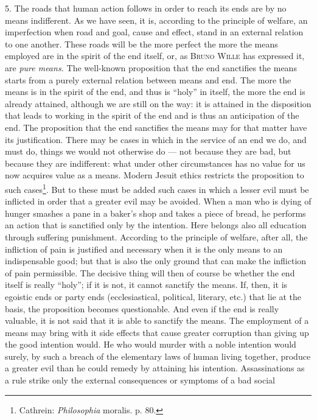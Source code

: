 \documentclass[12pt,a4paper,openany]{book}
\newcommand{\opage}[1]{\marginnote{\footnotesize\textit{[#1]}}}
\begin{document}
5. The roads that human action follows in order to reach its ends are by no means indifferent. As we have
seen, it is, according to the principle of welfare, an imperfection when road and goal, cause and effect,
stand in an external relation to one another. These roads will be the more perfect the more the means
employed are in the spirit of the end itself, or, as \textsc{Bruno Wille} has expressed it, are \textit{pure
means.} The well-known proposition that the end sanctifies the means starts from a purely external relation
between means and end. The more the means is in the
\opage{153}spirit of the end, and thus is ``holy'' in itself, the more the end is already attained, although we are
still on the way: it is attained in the disposition that leads to working in the spirit of the end and is
thus an anticipation of the end. The proposition that the end sanctifies the means may for that matter
have its justification. There may be cases in which in the service of an end we do, and must do, things we
would not otherwise do --- not because they are bad, but because they are indifferent: what under other
circumstances has no value for us now acquires value as a means. Modern Jesuit ethics restricts the
proposition to such cases\footnote[1]{Cathrein: \textit{Philosophia} moralis. p. 80.}. But to these must
be added such cases in which a lesser evil must be inflicted in order that a greater evil may be avoided.
When a man who is dying of hunger smashes a pane in a baker's shop and takes a piece of bread, he performs
an action that is sanctified only by the intention. Here belongs also all education through suffering
punishment. According to the principle of welfare, after all, the infliction of pain is justified and
necessary when it is the only means to an indispensable good; but that is also the only ground that can
make the infliction of pain permissible. The decisive thing will then of course be whether the end itself
is really ``holy''; if it is not, it cannot sanctify the means. If, then, it is egoistic ends or party ends
(ecclesiastical, political, literary, etc.) that lie at the basis, the proposition becomes questionable.
And even if the end is really valuable, it is not said that it is able to sanctify the means. The
employment of a means may bring with it side effects that cause greater corruption than giving up the good
intention would. He who would murder with a noble intention would surely, by such a breach of the
elementary laws of human living together, produce a greater evil than he could remedy by attaining his
intention. Assassinations as a rule strike only the external consequences or symptoms of a bad social
\end{document}
